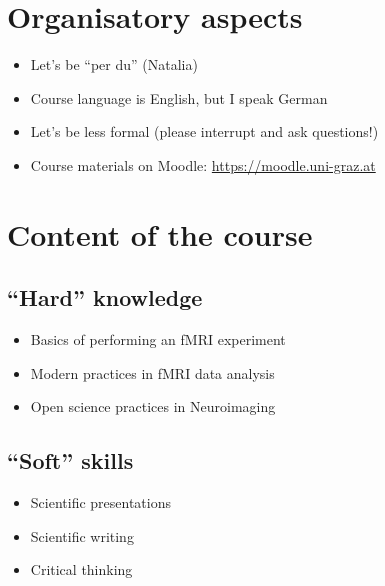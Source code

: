 \documentclass[
  letterpaper,
]{report}
\providecommand{\tightlist}{%
  \setlength{\itemsep}{0pt}\setlength{\parskip}{0pt}}\usepackage{longtable,booktabs,array}
\begin{document}
\section*{Organisatory aspects}\label{organisatory-aspects}


\begin{itemize}
\item
  Let's be ``per du'' (Natalia)
\item
  Course language is English, but I speak German
\item
  Let's be less formal (please interrupt and ask questions!)
\item
  Course materials on Moodle: \url{https://moodle.uni-graz.at}
\end{itemize}

\section*{Content of the course}\label{content-of-the-course}


\subsection*{``Hard'' knowledge}\label{hard-knowledge}

\begin{itemize}
\tightlist
\item
  Basics of performing an fMRI experiment
\item
  Modern practices in fMRI data analysis
\item
  Open science practices in Neuroimaging
\end{itemize}

\subsection*{``Soft'' skills}\label{soft-skills}

\begin{itemize}
\tightlist
\item
  Scientific presentations
\item
  Scientific writing
\item
  Critical thinking
\end{itemize}
\end{document}
